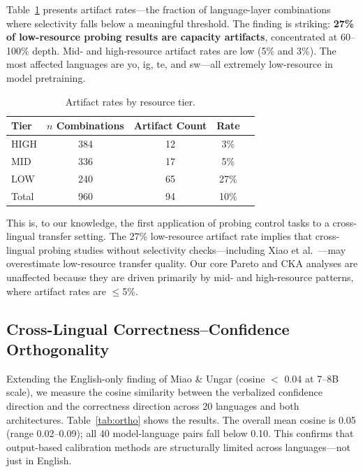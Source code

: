 \documentclass[11pt,a4paper]{article}
\begin{document}
Table~\ref{tab:artifact_rates} presents artifact rates---the fraction of language-layer combinations where selectivity falls below a meaningful threshold. The finding is striking: \textbf{27\% of low-resource probing results are capacity artifacts}, concentrated at 60--100\% depth. Mid- and high-resource artifact rates are low (5\% and 3\%). The most affected languages are yo, ig, te, and sw---all extremely low-resource in model pretraining.

\begin{table}[t]
\centering
\caption{Artifact rates by resource tier.}
\label{tab:artifact_rates}
\small
\begin{tabular}{lcccc}
\toprule
Tier & $n$ Combinations & Artifact Count & Rate \\
\midrule
HIGH  & 384 & 12 & 3\% \\
MID   & 336 & 17 & 5\% \\
LOW   & 240 & 65 & 27\% \\
\midrule
Total & 960 & 94 & 10\% \\
\bottomrule
\end{tabular}
\end{table}

This is, to our knowledge, the first application of probing control tasks to a cross-lingual transfer setting. The 27\% low-resource artifact rate implies that cross-lingual probing studies without selectivity checks---including Xiao et al.\ \cite{xiao2025crosslingual}---may overestimate low-resource transfer quality. Our core Pareto and CKA analyses are unaffected because they are driven primarily by mid- and high-resource patterns, where artifact rates are $\leq$5\%.

\subsection{Cross-Lingual Correctness--Confidence Orthogonality}
\label{sec:orthogonality}

Extending the English-only finding of Miao \& Ungar \cite{miao2026steering} (cosine $<$ 0.04 at 7--8B scale), we measure the cosine similarity between the verbalized confidence direction and the correctness direction across 20 languages and both architectures. Table~\ref{tab:ortho} shows the results. The overall mean cosine is 0.05 (range 0.02--0.09); all 40 model-language pairs fall below 0.10. This confirms that output-based calibration methods are structurally limited across languages---not just in English.
\end{document}
